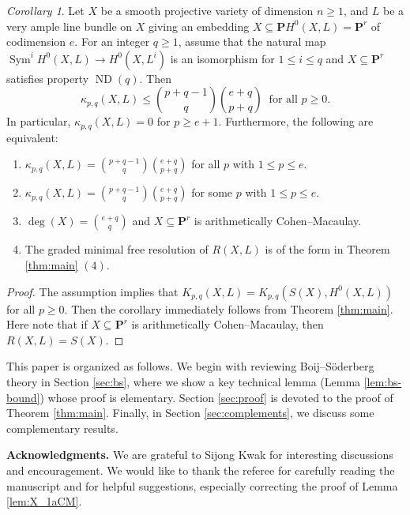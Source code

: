 \documentclass[12pt]{amsart}
\theoremstyle{definition}
\theoremstyle{remark}
\theoremstyle{corollary}
\theoremstyle{theorem}
\theoremstyle{corollary}
\theoremstyle{corollary}
\newtheorem{corollary}[theorem]{Corollary}
\theoremstyle{definition}
\theoremstyle{remark}
\numberwithin{equation}{section}
\def\nP{\mathbf{P}}
\def\Sym{\operatorname{Sym}}
\DeclareMathOperator{\ND}{ND}
\begin{document}
\begin{corollary}
Let $X$ be a smooth projective variety of dimension $n \geq 1$, and $L$ be a very ample line bundle on $X$ giving an embedding $X \subseteq \nP H^0(X, L) = \nP^r$ of codimension $e$. For an integer $q \geq 1$, assume that the natural map $\Sym^i H^0(X, L) \to H^0(X, L^i)$ is an isomorphism for $1 \leq i \leq q$ and $X \subseteq \nP^r$ satisfies property $\ND(q)$. Then
$$
\kappa_{p,q}(X, L) \leq {p+q-1 \choose q} {e+q \choose p+q}~\text{ for all $p \geq 0$}.
$$
In particular, $\kappa_{p,q}(X,L)=0$ for $p \geq e+1$.
Furthermore, the following are equivalent:
\begin{enumerate}
 \item $\kappa_{p,q}(X, L) = {p+q-1 \choose q} {e+q \choose p+q}$ for all $p$ with $1 \leq p \leq e$.
 \item $\kappa_{p,q}(X, L) = {p+q-1 \choose q} {e+q \choose p+q}$ for some $p$ with $1 \leq p \leq e$.
 \item $\deg (X) = {e+q \choose q}$ and $X \subseteq \nP^r$ is arithmetically Cohen--Macaulay.
 \item The graded minimal free resolution of $R(X,L)$ is of the form in Theorem \ref{thm:main} $(4)$.
\end{enumerate}
\end{corollary}

\begin{proof}
The assumption implies that $K_{p,q}(X, L) = K_{p,q}(S(X), H^0(X, L))$ for all $p \geq 0$. Then the corollary immediately follows from Theorem \ref{thm:main}. Here note that if $X \subseteq \nP^r$ is arithmetically Cohen--Macaulay, then $R(X,L)=S(X)$.
\end{proof}

This paper is organized as follows. We begin with reviewing Boij--S\"{o}derberg theory in Section \ref{sec:bs}, where we show a key technical lemma (Lemma \ref{lem:bs-bound}) whose proof is elementary. Section \ref{sec:proof} is devoted to the proof of Theorem \ref{thm:main}. Finally, in Section \ref{sec:complements}, we discuss some complementary results. 

\medskip

\noindent \textbf{Acknowledgments.} We are grateful to Sijong Kwak for interesting discussions and encouragement. We would like to thank the referee for carefully reading the manuscript and for helpful suggestions, especially correcting the proof of Lemma \ref{lem:X_1aCM}.
\end{document}
